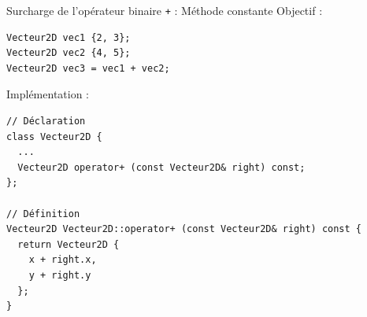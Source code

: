 \documentclass[c]{beamer}
\begin{document}

\begin{frame}[fragile]{Surcharge de l'opérateur binaire \texttt{+} : Méthode constante}
Objectif :
\begin{verbatim}
Vecteur2D vec1 {2, 3};
Vecteur2D vec2 {4, 5};
Vecteur2D vec3 = vec1 + vec2;
\end{verbatim}
\vspace{1em}
Implémentation :
\begin{verbatim}
// Déclaration
class Vecteur2D {
  ...
  Vecteur2D operator+ (const Vecteur2D& right) const;
};

// Définition
Vecteur2D Vecteur2D::operator+ (const Vecteur2D& right) const {
  return Vecteur2D {
    x + right.x,
    y + right.y
  };
}
\end{verbatim}
\end{frame}

\end{document}

